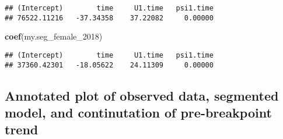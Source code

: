 \documentclass[]{article}
\newenvironment{Shaded}{\begin{snugshade}}{\end{snugshade}}
\newcommand{\KeywordTok}[1]{\textcolor[rgb]{0.13,0.29,0.53}{\textbf{#1}}}
\newcommand{\DecValTok}[1]{\textcolor[rgb]{0.00,0.00,0.81}{#1}}
\newcommand{\NormalTok}[1]{#1}
\begin{document}
\begin{verbatim}
## (Intercept)        time     U1.time   psi1.time 
## 76522.11216   -37.34358    37.22082     0.00000
\end{verbatim}

\begin{Shaded}
\begin{Highlighting}[]
\KeywordTok{coef}\NormalTok{(my.seg_female_}\DecValTok{2018}\NormalTok{)}
\end{Highlighting}
\end{Shaded}

\begin{verbatim}
## (Intercept)        time     U1.time   psi1.time 
## 37360.42301   -18.05622    24.11309     0.00000
\end{verbatim}

\subsection{Annotated plot of observed data, segmented model, and
continutation of pre-breakpoint
trend}\label{annotated-plot-of-observed-data-segmented-model-and-continutation-of-pre-breakpoint-trend}
\end{document}
